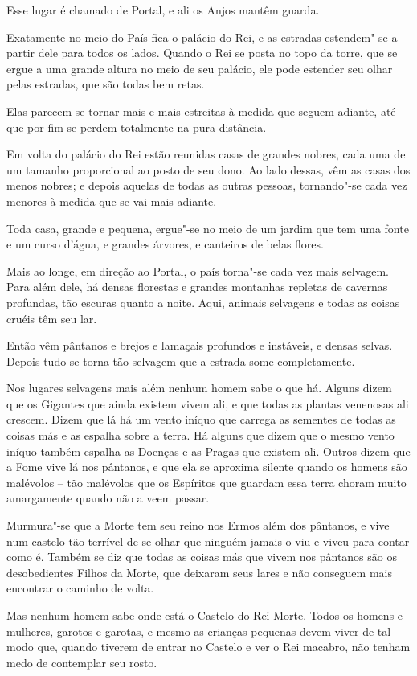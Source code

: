 Esse lugar é chamado de Portal, e ali os Anjos mantêm guarda.

Exatamente no meio do País fica o palácio do Rei, e as estradas
estendem"-se a partir dele para todos os lados. Quando o Rei se posta no
topo da torre, que se ergue a uma grande altura no meio de seu palácio,
ele pode estender seu olhar pelas estradas, que são todas bem retas.

Elas parecem se tornar mais e mais estreitas à medida que seguem
adiante, até que por fim se perdem totalmente na pura distância.

Em volta do palácio do Rei estão reunidas casas de grandes nobres, cada
uma de um tamanho proporcional ao posto de seu dono. Ao lado dessas, vêm
as casas dos menos nobres; e depois aquelas de todas as outras pessoas,
tornando"-se cada vez menores à medida que se vai mais adiante.

Toda casa, grande e pequena, ergue"-se no meio de um jardim que tem uma
fonte e um curso d'água, e grandes árvores, e canteiros de belas flores.

Mais ao longe, em direção ao Portal, o país torna"-se cada vez mais
selvagem. Para além dele, há densas florestas e grandes montanhas
repletas de cavernas profundas, tão escuras quanto a noite. Aqui,
animais selvagens e todas as coisas cruéis têm seu lar.

Então vêm pântanos e brejos e lamaçais profundos e instáveis, e densas
selvas. Depois tudo se torna tão selvagem que a estrada some
completamente.

Nos lugares selvagens mais além nenhum homem sabe o que há. Alguns
dizem que os Gigantes que ainda existem vivem ali, e que todas as
plantas venenosas ali crescem. Dizem que lá há um vento iníquo que
carrega as sementes de todas as coisas más e as espalha sobre a terra.
Há alguns que dizem que o mesmo vento iníquo também espalha as Doenças e
as Pragas que existem ali. Outros dizem que a Fome vive lá nos pântanos,
e que ela se aproxima silente quando os homens são malévolos -- tão
malévolos que os Espíritos que guardam essa terra choram muito
amargamente quando não a veem passar.

Murmura"-se que a Morte tem seu reino nos Ermos além dos pântanos, e vive
num castelo tão terrível de se olhar que ninguém jamais o viu e viveu
para contar como é. Também se diz que todas as coisas más que vivem nos
pântanos são os desobedientes Filhos da Morte, que deixaram seus lares e
não conseguem mais encontrar o caminho de volta.

Mas nenhum homem sabe onde está o Castelo do Rei Morte. Todos os homens
e mulheres, garotos e garotas, e mesmo as crianças pequenas devem viver
de tal modo que, quando tiverem de entrar no Castelo e ver o Rei
macabro, não tenham medo de contemplar seu rosto.

